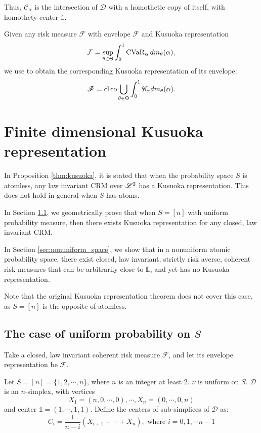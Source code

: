 Thus, \(\mathscr{C}_\alpha\) is the intersection of \(\mathscr{D}\) with a homothetic copy of itself, with homothety center \(\mathds{1}\). 

Given any risk measure $\mathcal{F}$ with envelope $\mathscr{F}$ and Kusuoka representation 
$$\mathcal{F} = \sup_{\theta \in \Theta}\int_0^1 \operatorname{CVaR}_\alpha dm_\theta(\alpha),$$
we use \cite[Table 3.3.1]{hiriart-urrutyFundamentalsConvexAnalysis2001} to obtain the corresponding Kusuoka representation of its envelope:
\begin{equation}
\label{eq:kusuoka_set}
\mathscr{F} = \operatorname*{cl}\operatorname*{co}\bigcup_{\theta \in \Theta}\int_0^1 \mathscr{C}_\alpha dm_\theta(\alpha).
\end{equation}

\section{Finite dimensional Kusuoka representation}
In Proposition \ref{thm:kusuoka}, it is stated that when the probability space $S$ is atomless, any law invariant CRM over $\mathscr{L}^2$ has a Kusuoka representation. This does not hold in general when $S$ has atoms.

In Section \ref{sec:uniform_space}, we geometrically prove that when \(S=[n]\) with uniform probability measure, then there exists Kusuoka representation for any closed, law invariant CRM.

In Section \ref{sec:nonuniform_space}, we show that in a nonuniform atomic probability space, there exist closed, law invariant, strictly risk averse, coherent risk measures that can be arbitrarily close to \(\mathbb{E}\), and yet has no Kusuoka representation. 

Note that the original Kusuoka representation theorem does not cover this case, as $S=[n]$ is the opposite of atomless.

\subsection{The case of uniform probability on \(S\)}
\label{sec:uniform_space}

Take a closed, law invariant coherent risk measure \(\mathcal{F}\), and let its envelope representation be \(\mathscr{F}\).

Let \(S = [n]= \{1, 2, \cdots , n\} \), where \(n \) is an integer at least \(2\). \(\nu\) is uniform on \(S\). \(\mathscr{D}\) is an \(n\)-simplex, with vertices 
\[X_1 = (n, 0, \cdots , 0), \cdots , X_n = (0, \cdots , 0, n)\]
and center \(\mathds{1} = (1, \cdots , 1, 1)\). Define the centers of sub-simplices of \(\mathscr{D}\) as:
\[C_i = \frac{1}{n - i}(X_{i+1} + \cdots  + X_n), \text{ where }i = 0, 1, \cdots n-1\]

